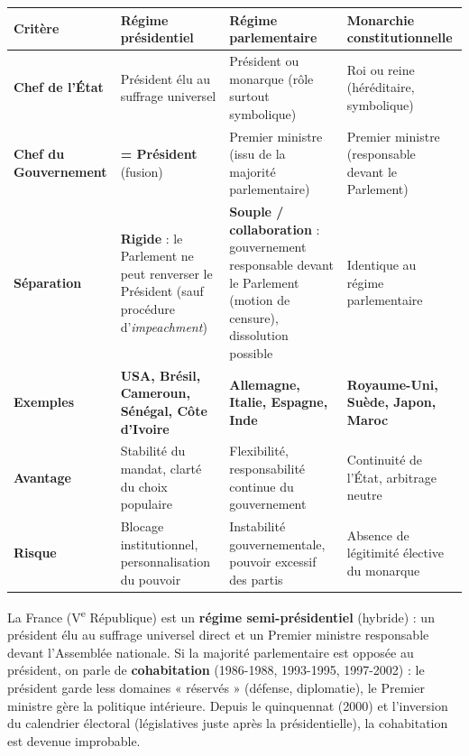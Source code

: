 \documentclass[11pt]{article}
\begin{document}
\begin{center}
\begin{tabularx}{\linewidth}{|l|X|X|X|}\hline
\rowcolor{popblue} \textbf{\color{white}Critère} & \textbf{\color{white}Régime présidentiel} & \textbf{\color{white}Régime parlementaire} & \textbf{\color{white}Monarchie constitutionnelle} \\ \hline
\textbf{Chef de l'État} & Président élu au suffrage universel & Président ou monarque (rôle surtout symbolique) & Roi ou reine (héréditaire, symbolique) \\ \hline
\textbf{Chef du Gouvernement} & \textbf{= Président} (fusion) & Premier ministre (issu de la majorité parlementaire) & Premier ministre (responsable devant le Parlement) \\ \hline
\textbf{Séparation} & \textbf{Rigide} : le Parlement ne peut renverser le Président (sauf procédure d'\emph{impeachment}) & \textbf{Souple / collaboration} : gouvernement responsable devant le Parlement (motion de censure), dissolution possible & Identique au régime parlementaire \\ \hline
\textbf{Exemples} & \textbf{USA, Brésil, Cameroun, Sénégal, Côte d'Ivoire} & \textbf{Allemagne, Italie, Espagne, Inde} & \textbf{Royaume-Uni, Suède, Japon, Maroc} \\ \hline
\textbf{Avantage} & Stabilité du mandat, clarté du choix populaire & Flexibilité, responsabilité continue du gouvernement & Continuité de l'État, arbitrage neutre \\ \hline
\textbf{Risque} & Blocage institutionnel, personnalisation du pouvoir & Instabilité gouvernementale, pouvoir excessif des partis & Absence de légitimité élective du monarque \\ \hline
\end{tabularx}
\end{center}

\begin{savaistu}
La France (V\textsuperscript{e} République) est un \textbf{régime semi-présidentiel} (hybride) : un président élu au suffrage universel direct et un Premier ministre responsable devant l'Assemblée nationale. Si la majorité parlementaire est opposée au président, on parle de \textbf{cohabitation} (1986-1988, 1993-1995, 1997-2002) : le président garde less domaines « réservés » (défense, diplomatie), le Premier ministre gère la politique intérieure. Depuis le quinquennat (2000) et l'inversion du calendrier électoral (législatives juste après la présidentielle), la cohabitation est devenue improbable.
\end{savaistu}
\end{document}
